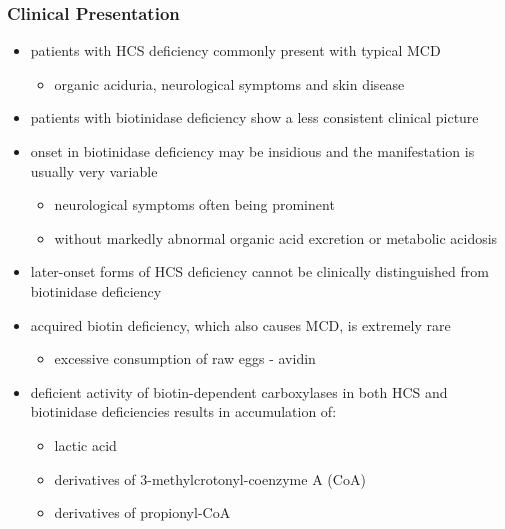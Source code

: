 \documentclass{scrartcl}
\begin{document}
\subsubsection{Clinical Presentation}
\label{sec:org5d728bd}
\begin{itemize}
\item patients with HCS deficiency commonly present with typical MCD
\begin{itemize}
\item organic aciduria, neurological symptoms and skin
disease
\end{itemize}
\item patients with biotinidase deficiency show a less consistent clinical
picture
\item onset in biotinidase deficiency may be insidious and the
manifestation is usually very variable
\begin{itemize}
\item neurological symptoms often being prominent
\item without markedly abnormal organic acid excretion or metabolic
acidosis
\end{itemize}
\item later-onset forms of HCS deficiency cannot be clinically
distinguished from biotinidase deficiency

\item acquired biotin deficiency, which also causes MCD, is extremely rare
\begin{itemize}
\item excessive consumption of raw eggs - avidin
\end{itemize}

\item deficient activity of biotin-dependent carboxylases in both HCS and
biotinidase deficiencies results in accumulation of:
\begin{itemize}
\item lactic acid
\item derivatives of 3-methylcrotonyl-coenzyme A (CoA)
\item derivatives of propionyl-CoA
\end{itemize}
\end{itemize}
\end{document}
